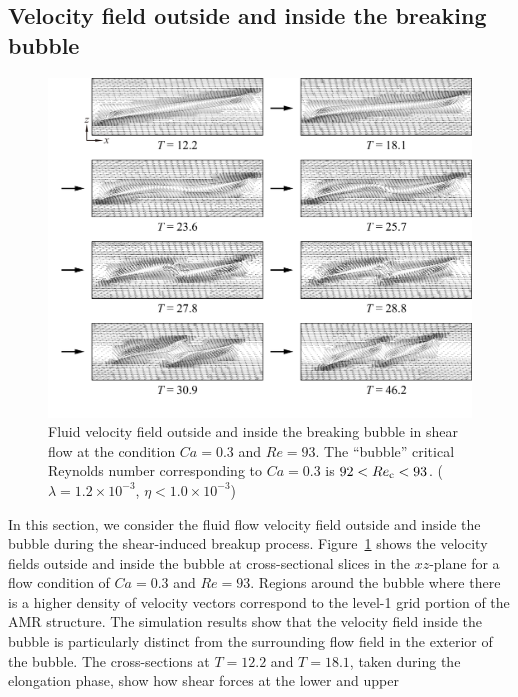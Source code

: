\documentclass[%
 reprint,
 showkeys,
 amsmath,amssymb,
 aps,
 prfluids,
 onecolumn
]{revtex4-2}
\begin{document}
\subsection{Velocity field outside and inside the breaking bubble}
%
\begin{figure}%
  \centering
  \includegraphics[width=\textwidth]{BubbleFieldCa0p3Re93}
  \caption{Fluid velocity field outside and inside the breaking bubble in
           shear flow at the condition $Ca=0.3$ and $Re=93$.
	   The ``bubble'' 
	   critical Reynolds number corresponding to $Ca=0.3$ is
	   $92<Re_{\rm c}<93$.
           ($\lambda = 1.2 \times 10^{-3}$, $\eta < 1.0 \times 10^{-3}$) 
	   }
  \label{fig:BubbleFieldCa0p3Re93}
\end{figure}
%
In this section, we consider the fluid flow velocity field outside and inside
the bubble during the shear-induced breakup process.
Figure~\ref{fig:BubbleFieldCa0p3Re93} shows the velocity fields outside and
inside the bubble at cross-sectional slices in the $xz$-plane for a flow
condition of $Ca = 0.3$ and $Re = 93$.  Regions around the bubble where there
is a higher density of velocity vectors correspond to the level-1 grid portion
of the AMR structure.  The simulation results show that the velocity field
inside the bubble is particularly distinct from the surrounding flow field in
the exterior of the bubble.  The cross-sections at $T=12.2$ and $T=18.1$, taken
during the elongation phase, show how shear forces at the lower and upper
\end{document}
